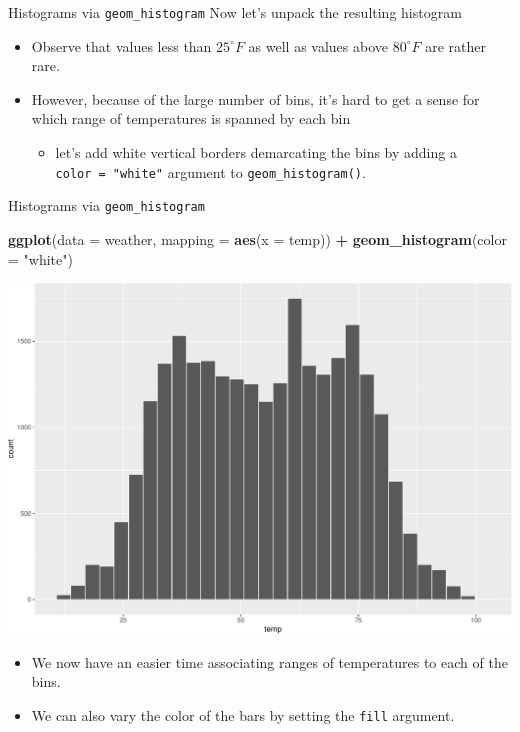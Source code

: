 \documentclass[
  ignorenonframetext,
]{beamer}
\newenvironment{Shaded}{\begin{snugshade}}{\end{snugshade}}
\newcommand{\AttributeTok}[1]{\textcolor[rgb]{0.13,0.29,0.53}{#1}}
\newcommand{\FunctionTok}[1]{\textcolor[rgb]{0.13,0.29,0.53}{\textbf{#1}}}
\newcommand{\NormalTok}[1]{#1}
\newcommand{\SpecialCharTok}[1]{\textcolor[rgb]{0.81,0.36,0.00}{\textbf{#1}}}
\newcommand{\StringTok}[1]{\textcolor[rgb]{0.31,0.60,0.02}{#1}}
\providecommand{\tightlist}{%
  \setlength{\itemsep}{0pt}\setlength{\parskip}{0pt}}
\begin{document}
\begin{frame}[fragile]{Histograms via \texttt{geom\_histogram}}
\protect\hypertarget{histograms-via-geom_histogram-1}{}
Now let's unpack the resulting histogram

\begin{itemize}
\item
  Observe that values less than \(25^{\circ}F\) as well as values above
  \(80^{\circ}F\) are rather rare.
\item
  However, because of the large number of bins, it's hard to get a sense
  for which range of temperatures is spanned by each bin

  \begin{itemize}
  \tightlist
  \item
    let's add white vertical borders demarcating the bins by adding a
    \texttt{color\ =\ "white"} argument to \texttt{geom\_histogram()}.
  \end{itemize}
\end{itemize}
\end{frame}

\begin{frame}[fragile]{Histograms via \texttt{geom\_histogram}}
\protect\hypertarget{histograms-via-geom_histogram-2}{}
\tiny

\begin{Shaded}
\begin{Highlighting}[]
\FunctionTok{ggplot}\NormalTok{(}\AttributeTok{data =}\NormalTok{ weather, }\AttributeTok{mapping =} \FunctionTok{aes}\NormalTok{(}\AttributeTok{x =}\NormalTok{ temp)) }\SpecialCharTok{+}
  \FunctionTok{geom\_histogram}\NormalTok{(}\AttributeTok{color =} \StringTok{"white"}\NormalTok{)}
\end{Highlighting}
\end{Shaded}

\begin{center}\includegraphics[width=0.7\linewidth,height=0.5\textheight]{Week2_files/figure-beamer/unnamed-chunk-27-1} \end{center}
\normalsize

\begin{itemize}
\item
  We now have an easier time associating ranges of temperatures to each
  of the bins.
\item
  We can also vary the color of the bars by setting the \texttt{fill}
  argument.
\end{itemize}
\end{frame}
\end{document}
